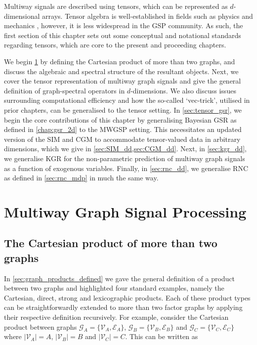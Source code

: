 Multiway signals are described using tensors, which can be represented as $d$-dimensional arrays. Tensor algebra is well-established in fields such as physics and mechanics \citep{Renteln2013}, however, it is less widespread in the GSP community. As such, the first section of this chapter sets out some conceptual and notational standards regarding tensors, which are core to the present and proceeding chapters. 


We begin \cref{sec:dd_gsp} by defining the Cartesian product of more than two graphs, and discuss the algebraic and spectral structure of the resultant objects. Next, we cover the tensor representation of multiway graph signals and give the general definition of graph-spectral operators in $d$-dimensions. We also discuss issues surrounding computational efficiency and how the so-called `vec-trick', utilised in prior chapters, can be generalised to the tensor setting. In \cref{sec:tensor_gsr}, we begin the core contributions of this chapter by generalising Bayesian GSR as defined in \cref{chap:gsr_2d} to the MWGSP setting. This necessitates an updated version of the SIM and CGM to accommodate tensor-valued data in arbitrary dimensions, which we give in \cref{sec:SIM_dd,sec:CGM_dd}. Next, in \cref{sec:kgr_dd}, we generalise KGR for the non-parametric prediction of multiway graph signals as a function of exogenous variables. Finally, in \cref{sec:rnc_dd}, we generalise RNC as defined in \cref{sec:rnc_mdp} in much the same way.  



\section{Multiway Graph Signal Processing}

\label{sec:dd_gsp}

\subsection{The Cartesian product of more than two graphs}

In \cref{sec:graph_products_defined} we gave the general definition of a product between two graphs and highlighted four standard examples, namely the Cartesian, direct, strong and lexicographic products. Each of these product types can be straightforwardly extended to more than two factor graphs by applying their respective definition recursively. For example, consider the Cartesian product between graphs $\mathcal{G}_A = \{\mathcal{V}_A, \mathcal{E}_A\}$, $\mathcal{G}_B = \{\mathcal{V}_B, \mathcal{E}_B\}$ and $\mathcal{G}_C = \{\mathcal{V}_C, \mathcal{E}_C\}$ where $|\mathcal{V}_A| = A$, $|\mathcal{V}_B| = B$ and $|\mathcal{V}_C| = C$. This can be written as 

